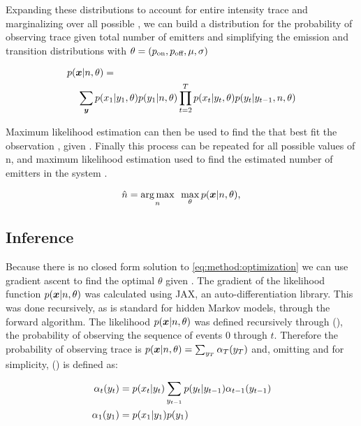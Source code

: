 Expanding these distributions to account for entire intensity trace \trace and marginalizing over all possible \states, we can build a distribution for the probability of observing trace \trace given total number of emitters \n and simplifying the emission and transition distributions with $\theta = (p_\text{on}, p_\text{off}, \mu, \sigma)$

\begin{align*}
  p(\bm{x}|n,\theta) &=\\
    \sum_{\bm{y}}
      p(&x_{1}|y_{1}, \theta)
      p(y_{1}|n, \theta)
      \prod_{t=2}^{T}
        p(x_{t}|y_{t}, \theta)
        p(y_{t}|y_{t-1},n, \theta)
  \label{eq:method:likelihood}
\end{align*}

Maximum likelihood estimation can then be used to find the \parameters that best fit the observation \trace, given \n. 
Finally this process can be repeated for all possible values of n, and maximum likelihood estimation used to find the estimated number of emitters in the system \estimatedn.

\begin{equation}
    \hat{n} =
    \mathop{\arg\max}_{n}\hspace{0.5em}
    \max_\theta
    p(\bm{x}|n,\theta)
  \text{,}
  \label{eq:method:optimization}
\end{equation}

\subsection{Inference}

Because there is no closed form solution to  \eqref{eq:method:optimization} we can use gradient ascent to find the optimal $\theta$ given \n.
The gradient of the likelihood function $p(\bm{x} | n, \theta)$ was calculated using JAX, an auto-differentiation library.
This was done recursively, as is standard for hidden Markov models, through the forward algorithm.
The likelihood $p(\bm{x} | n, \theta)$ was defined recursively through \pchain(), the probability of observing the sequence of events 0 through $t$.
Therefore the probability of observing trace \trace is $ p(\bm{x}|n,\theta) = \sum_{y_{T}} \alpha_T(y_{T})$ and, omitting \n and \parameters for simplicity, \pchain()  is defined as:

\begin{align*}
  \alpha_{t}(y_{t}) &= p(x_{t}|y_{t}) \sum_{y_{t-1}} p(y_{t} | y_{t-1}) \alpha_{t-1}(y_{t-1})\\
  \alpha_{1}(y_{1}) &= p(x_{1}|y_{1}) p(y_{1})
\end{align*}

